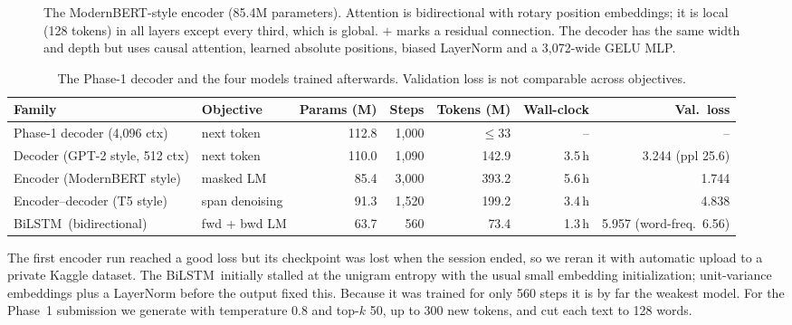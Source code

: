 \documentclass[10pt,a4paper]{article}
\newcommand{\bs}{BiLSTM}
\begin{document}
\begin{figure}[h]\centering
{}
\caption{The ModernBERT-style encoder (85.4M parameters). Attention is bidirectional with rotary position embeddings; it is local (128 tokens) in all layers except every third, which is global. $+$ marks a residual connection. The decoder has the same width and depth but uses causal attention, learned absolute positions, biased LayerNorm and a 3{,}072-wide GELU MLP.}\label{fig:arch}
\end{figure}
\begin{table}[h]\centering\small
\caption{The Phase-1 decoder and the four models trained afterwards. Validation loss is not comparable across objectives.}\label{tab:p1}
\begin{tabular}{@{}llrrrrr@{}}
\toprule
Family & Objective & Params (M) & Steps & Tokens (M) & Wall-clock & Val.\ loss\\\midrule
Phase-1 decoder (4{,}096 ctx) & next token & 112.8 & 1{,}000 & $\le$33 & -- & --\\
Decoder (GPT-2 style, 512 ctx) & next token & 110.0 & 1{,}090 & 142.9 & 3.5\,h & 3.244 (ppl 25.6)\\
Encoder (ModernBERT style) & masked LM & 85.4 & 3{,}000 & 393.2 & 5.6\,h & 1.744\\
Encoder--decoder (T5 style) & span denoising & 91.3 & 1{,}520 & 199.2 & 3.4\,h & 4.838\\
\bs\ (bidirectional) & fwd + bwd LM & 63.7 & 560 & 73.4 & 1.3\,h & 5.957 (word-freq.\ 6.56)\\\bottomrule
\end{tabular}
\end{table}
The first encoder run reached a good loss but its checkpoint was lost when the session ended, so we reran it with automatic upload to a private Kaggle dataset. The \bs\ initially stalled at the unigram entropy with the usual small embedding initialization; unit-variance embeddings plus a LayerNorm before the output fixed this. Because it was trained for only 560 steps it is by far the weakest model. For the Phase~1 submission we generate with temperature 0.8 and top-$k$ 50, up to 300 new tokens, and cut each text to 128 words.
\end{document}
